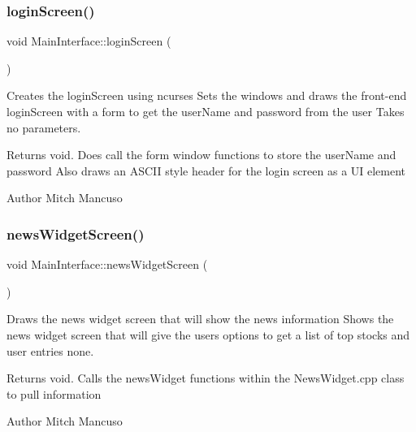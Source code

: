 \subsubsection{\texorpdfstring{login\+Screen()}{loginScreen()}}
{\footnotesize\ttfamily void Main\+Interface\+::login\+Screen (\begin{DoxyParamCaption}{ }\end{DoxyParamCaption})}



Creates the login\+Screen using ncurses  Sets the windows and draws the front-\/end login\+Screen with a form to get the user\+Name and password from the user  Takes no parameters. 

\begin{DoxyReturn}{Returns}
void. Does call the form window functions to store the user\+Name and password Also draws an A\+S\+C\+II style header for the login screen as a UI element 
\end{DoxyReturn}
\begin{DoxyAuthor}{Author}
Mitch Mancuso 
\end{DoxyAuthor}
\mbox{\label{class_main_interface_aca2ed8a09e281148a1e3d45299384885}} 
\subsubsection{\texorpdfstring{news\+Widget\+Screen()}{newsWidgetScreen()}}
{\footnotesize\ttfamily void Main\+Interface\+::news\+Widget\+Screen (\begin{DoxyParamCaption}{ }\end{DoxyParamCaption})}



Draws the news widget screen that will show the news information  Shows the news widget screen that will give the users options to get a list of top stocks and user entries  none. 

\begin{DoxyReturn}{Returns}
void. Calls the news\+Widget functions within the News\+Widget.\+cpp class to pull information 
\end{DoxyReturn}
\begin{DoxyAuthor}{Author}
Mitch Mancuso 
\end{DoxyAuthor}
\mbox{\label{class_main_interface_a4c5fbc56836bf55dda9cf809dd11f147}} 
